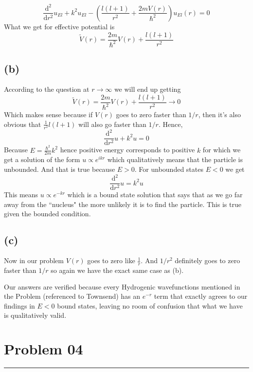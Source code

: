 \documentclass[letter, 10pts]{article}
\newcommand{\hb}{\hbar}
\begin{document}
\[
	\frac{\mathrm{d} ^2}{\mathrm{d} r^2} u_{El}+k^2 u_{El} -  \left( \frac{l(l+1)}{r^2}  + \frac{2mV(r)}{\hb^2}\right) u_{El}(r) = 0 
\] 
What we get for effective potential is 
\[
	\tilde{V}(r) = \frac{2m}{\hb^2} V(r) + \frac{l(l+1)}{r^2}
\] 



\subsection*{(b)} 
According to the question at $r \to  \infty$ we will end up getting
\[
	\tilde{V}(r) = \frac{2m}{\hb^2} V(r) + \frac{l(l+1)}{r^2} \to  0
\]
Which makes sense because if $V(r)$ goes to zero faster than $1 / r$, then it's also obvious that $\frac{1}{ r^2} l (l+1)$ will also go faster than $1 / r$. 
Hence, 
\[
\frac{\mathrm{d} ^2}{\mathrm{d} r^2} u + k^2 u = 0 
\]
Because $E = \frac{\hb ^2}{2 m} k^2$ hence positive energy corresponds to positive $k$ for which we get a solution of the form $u \propto e^{i k r}$ which qualitatively means that the particle is unbounded. And that is true because $E > 0$. For unbounded states $E < 0$ we get
\[
\frac{\mathrm{d} ^2}{\mathrm{d} r^2} u = k^2 u 
\] 
This means $u \propto e^{-k r}$ which is a bound state solution that says that as we go far away from the ``nucleus" the more unlikely it is to find the particle. This is true given the bounded condition. 


\subsection*{(c)}  Now in our problem $V(r)$ goes to zero like $\frac{1}{r}$. And $1 / r^2$ definitely goes to zero faster than $ 1 / r$ so again we have the exact same case as (b). 

Our answers are verified because every Hydrogenic wavefunctions mentioned in the Problem (referenced to Townsend) has an $e^{-r}$ term that exactly agrees to our findings in $E < 0$ bound states, leaving no room of confusion that what we have is qualitatively valid. 



















\section*{Problem 04} 
\hrule 
\end{document}

